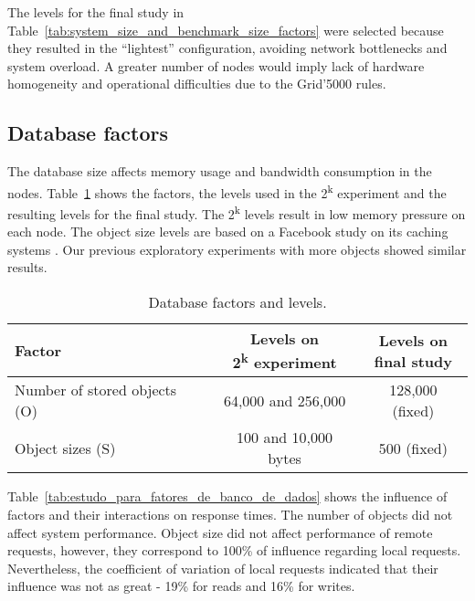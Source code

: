 \documentclass[man,floatsintext,12pt]{apa6}
\begin{document}
The levels for the final study in
Table~\ref{tab:system_size_and_benchmark_size_factors} were selected because
they resulted in the ``lightest'' configuration, avoiding network bottlenecks
and system overload. A greater number of nodes would imply lack of hardware
homogeneity and operational difficulties due to the Grid'5000 rules.

\subsection{Database factors}

The database size affects memory usage and bandwidth consumption in the nodes.
Table~\ref{tab:database_factors_and_levels} shows the factors, the levels used
in the 2\textsuperscript{k} experiment and the resulting levels for the final
study. The 2\textsuperscript{k} levels result in low memory pressure on each
node. The object size levels are based on a Facebook study on its caching
systems \parencite{Atikoglu2012}. Our previous exploratory experiments with
more objects showed similar results.

\begin{table}[h!]
\caption{Database factors and levels.}
\label{tab:database_factors_and_levels}
\begin{tabular}{lcc} \toprule
Factor & \thead{Levels on \\ 2\textsuperscript{k} experiment} & \thead{Levels on \\final study} \\ \midrule

Number of stored objects (O) & 64,000 and 256,000 & 128,000 (fixed)\\

Object sizes (S) & 100 and 10,000 bytes & 500 (fixed)\\ \bottomrule

\end{tabular}  
\end{table}

Table~\ref{tab:estudo_para_fatores_de_banco_de_dados} shows the influence of
factors and their interactions on response times. The number of objects did not
affect system performance. Object size did not affect performance of remote
requests, however, they correspond to 100\% of influence regarding local
requests. Nevertheless, the coefficient of variation of local requests
indicated that their influence was not as great - 19\% for reads and 16\% for
writes.
\end{document}
